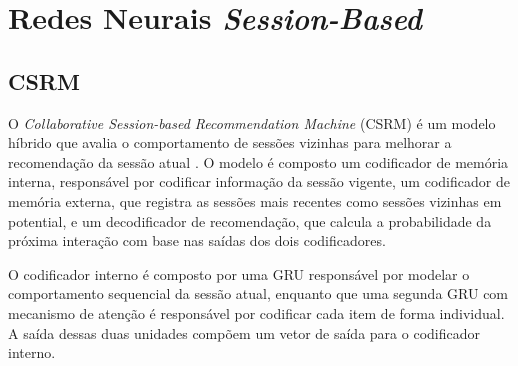 



\section{Redes Neurais \textit{Session-Based}}
\subsection{CSRM}
O \textit{Collaborative Session-based Recommendation Machine} (CSRM) é um modelo
híbrido que avalia o comportamento de sessões vizinhas para melhorar a
recomendação da sessão atual \cite{collaborative2018}. O modelo é composto um
codificador de memória interna, responsável por codificar informação da sessão
vigente, um codificador de memória externa, que registra as sessões mais
recentes como sessões vizinhas em potential, e um decodificador de recomendação,
que calcula a probabilidade da próxima interação com base nas saídas dos dois
codificadores.

O codificador interno é composto por uma GRU responsável por modelar
o comportamento sequencial da sessão atual, enquanto que uma segunda GRU com
mecanismo de atenção é responsável por codificar cada item de forma individual.
A saída dessas duas unidades compõem um vetor de saída para o codificador interno.

